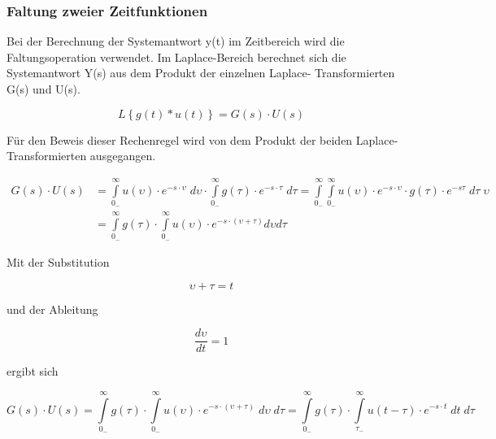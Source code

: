 \subsubsection{Faltung zweier Zeitfunktionen}

\noindent Bei der Berechnung der Systemantwort y(t) im Zeitbereich wird die Faltungsoperation verwendet. Im Laplace-Bereich berechnet sich die Systemantwort Y(s) aus dem Produkt der einzelnen Laplace-
Transformierten G(s) und U(s).

\begin{equation}\label{eq:foureightythree}
L\left\{g\left(t\right)*u\left(t\right)\right\}=G\left(s\right)\cdot U\left(s\right)
\end{equation}

\noindent Für den Beweis dieser Rechenregel wird von dem Produkt der beiden Laplace-Transformierten ausgegangen.

\begin{equation}\label{eq:foureightyfour}
\begin{split}
G\left(s\right)\cdot U\left(s\right) & = \int\limits _{0_{-} }^{\infty }u\left(\upsilon \right)\cdot e^{-s\cdot \upsilon } \; d\upsilon  \cdot \int\limits _{0_{-} }^{\infty }g\left(\tau \right)\cdot e^{-s\cdot \tau } \;d\tau  =\int\limits _{0_{-} }^{\infty }\int\limits _{0_{-} }^{\infty }u\left(\upsilon \right)\cdot e^{-s\cdot \upsilon } \cdot g\left(\tau \right)\cdot e^{-s\tau } \; d\tau\;\upsilon \\
& = \int\limits _{0_{-} }^{\infty }g\left(\tau \right)\cdot  \int\limits _{0_{-} }^{\infty } u(\upsilon)\cdot e^{-s\cdot( \upsilon + \tau) } d\upsilon d\tau 
\end{split}
\end{equation}

\noindent Mit der Substitution

\begin{equation}\label{eq:foureightyfive}
\upsilon + \tau = t
\end{equation}

\noindent und der Ableitung

\begin{equation}\label{eq:foureightysix}
\frac{d\upsilon }{dt} =1
\end{equation}

\noindent ergibt sich

\begin{equation}\label{eq:foureightyseven}
G\left(s\right)\cdot U\left(s\right)=\int\limits _{0_{-} }^{\infty }g\left(\tau \right)\cdot \int\limits _{0_{-} }^{\infty }u\left(\upsilon \right)\cdot e^{-s\cdot (\upsilon +\tau )} \;d\upsilon \;d\tau   =\int\limits _{0_{-} }^{\infty }g\left(\tau \right)\cdot \int\limits _{\tau _{-} }^{\infty }u\left(t-\tau \right)\cdot e^{-s\cdot t} \;dt\;d\tau  
\end{equation}

